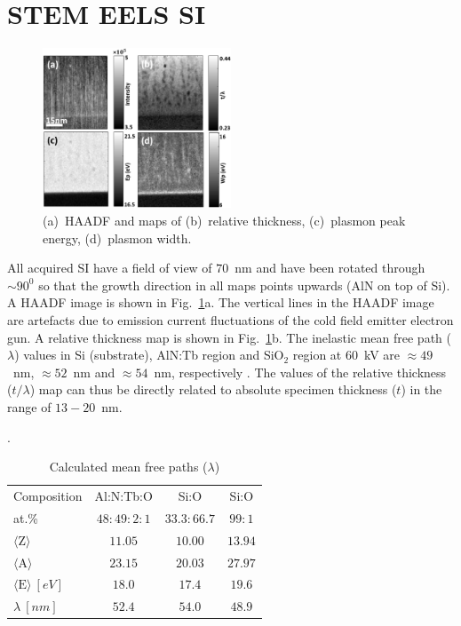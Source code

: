 \documentclass[%
aip,
rsi,%
 amsmath,amssymb,%
 reprint,%
]{revtex4-1}
\begin{document}
\section{STEM EELS SI}
\label{sec:STEMEELSSI}
\begin{figure}
	\centering
    \includegraphics[width=0.5\textwidth]{combined_haadf}
    \caption{(a)~HAADF and maps of (b)~relative thickness, (c)~plasmon peak energy, (d)~plasmon width.}
    \label{fig:combined_haadf}
\end{figure}
All acquired SI have a field of view of $70$~nm and have been rotated through $\sim90^0$ so that the growth direction in all maps points upwards (AlN on top of Si). A HAADF image is shown in Fig.~\ref{fig:combined_haadf}a. The vertical lines in the HAADF image are artefacts due to emission current fluctuations of the cold field emitter electron gun. A relative thickness map is shown in Fig.~\ref{fig:combined_haadf}b. The inelastic mean free path ($\lambda$) values in Si (substrate), AlN:Tb region and SiO$_2$ region at $60$~kV are $\approx49$~nm, $\approx52$~nm and $\approx54$~nm, respectively \cite{egerton2011}. The values of the relative thickness ($t/\lambda$) map can thus be directly related to absolute specimen thickness ($t$) in the range of $13-20$~nm.
\begin{table}%
	\caption{Calculated mean free paths ($\lambda$)}.
    \label{tab:lambda}
    \begin{ruledtabular}
    	\begin{tabular}{lccc}
        	Composition&Al:N:Tb:O&Si:O&Si:O										\\
            at.\%&$48:49:2:1$&$33.3:66.7$&$99:1$								\\ \hline
        	$\langle \text{Z} \rangle$&$11.05$&$10.00$&$13.94$					\\
            $\langle \text{A} \rangle$&$23.15$&$20.03$&$27.97$					\\
            $\langle \text{E} \rangle~\left[eV\right]$&$18.0$&$17.4$&$19.6$		\\
           	$\lambda~\left[nm\right]$&$52.4$&$54.0$&$48.9$
    	\end{tabular}
    \end{ruledtabular}
\end{table}
\end{document}
